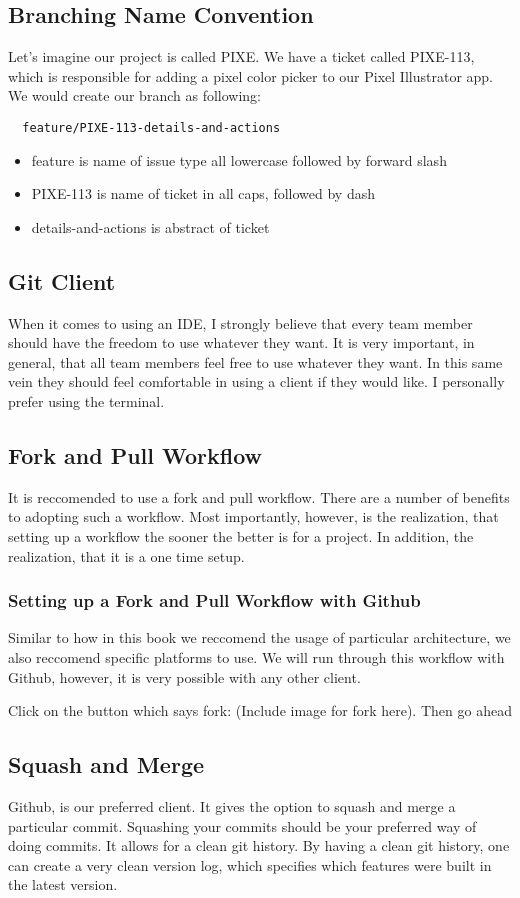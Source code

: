 \subsection { Branching Name Convention }
Let's imagine our project is called PIXE. We have a ticket called PIXE-113,
which is responsible for adding a pixel color picker to our Pixel Illustrator
app. We would create our branch as following:

\begin{verbatim}
  feature/PIXE-113-details-and-actions
\end{verbatim}

\begin{itemize}
  \item feature is name of issue type all lowercase followed by forward slash
  \item PIXE-113 is name of ticket in all caps, followed by dash
  \item details-and-actions is abstract of ticket
\end{itemize} 

\subsection { Git Client }
When it comes to using an IDE, I strongly believe that every team member should
have the freedom to use whatever they want. It is very important, in general,
that all team members feel free to use whatever they want. In this same vein
they should feel comfortable in using a client if they would like. I personally
prefer using the terminal.

\subsection { Fork and Pull Workflow }
It is reccomended to use a fork and pull workflow. There are a number of
benefits to adopting such a workflow. Most importantly, however, is the
realization, that setting up a workflow the sooner the better is for a project.
In addition, the realization, that it is a one time setup.

\subsubsection { Setting up a Fork and Pull Workflow with Github }
Similar to how in this book we reccomend the usage of particular architecture,
we also reccomend specific platforms to use. We will run through this workflow
with Github, however, it is very possible with any other client.

Click on the button which says fork: (Include image for fork here).
Then go ahead


\subsection { Squash and Merge }
Github, is our preferred client. It gives the option to squash and merge a
particular commit. Squashing your commits should be your preferred way of doing
commits. It allows for a clean git history. By having a clean git history, one
can create a very clean version log, which specifies which features were built
in the latest version.
